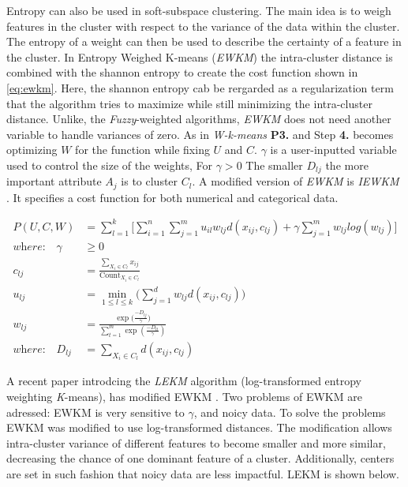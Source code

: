 \documentclass[../report.tex]{subfiles}
\begin{document}
Entropy can also be used in soft-subspace clustering. The main idea is to weigh features in the cluster with respect to the variance of the data within the cluster\cite{Domeniconi2007}. The entropy of a weight can then be used to describe the certainty of a feature in the cluster. In Entropy Weighed K-means (\textit{EWKM}) \cite{Jing2007} the intra-cluster distance is combined with the shannon entropy to create the cost function shown in \ref{eq:ewkm}. Here, the shannon entropy cab be rergarded as a regularization term that the algorithm tries to maximize while still minimizing the intra-cluster distance. Unlike, the \textit{Fuzzy}-weighted algorithms, \textit{EWKM} does not need another variable to handle variances of zero. As in \textit{W-k-means} \textbf{P3.} and Step \textbf{4.} becomes optimizing $W$ for the function while fixing $U$ and $C$. $\gamma$ is a user-inputted variable used to control the size of the weights, For $\gamma > 0$ The smaller $D_{ lj }$ the more important attribute $A_j$ is to cluster $C_l$. A modified version of \textit{EWKM} is \textit{IEWKM} \cite{Li2008}. It specifies a cost function for both numerical and categorical data.

\begin{align}
  P(U,C,W) &= \sum^k_{l=1} \Bigg[ \sum^n_{i=1} \sum^m_{j=1} u_{il} w_{ lj } d(x_{ij},c_{lj}) + \gamma \sum_{j=1}^{m}{ w_{lj} log (w_{lj}) } \Bigg] \\
\textit{where:}\quad\gamma&\geq 0 \\
\label{eq:ewkm}
c_{lj} &= \frac{\sum_{X_i \in C_l}{ x_{ij} }}{\text{Count}_{X_i \in C_l}} \\
u_{lj} &= \min_{1 \leq l \leq k}\Big( \sum_{j=1}^{d} w_{lj} d(x_{ij},c_{ lj })\Big) \\
	w_{lj} &= \frac{\exp({\frac{-D_{lj}}{\gamma})}}{\sum_{t=1}^{m}{\exp{(\frac{-D_{lt}}{\gamma})}}} \\
\textit{where:}\quad D_{ lj } &= \sum_{X_i \in C_l}{d(x_{ij},c_{ lj })}
\end{align}

A recent paper introdcing the \textit{LEKM} algorithm (log-transformed entropy weighting \textit{K}-means), has modified EWKM \cite{Gan2016}. Two problems of EWKM are adressed: EWKM is very sensitive to $\gamma$, and noicy data. To solve the problems EWKM was modified to use log-transformed distances. The modification allows intra-cluster variance of different features to become smaller and more similar, decreasing the chance of one dominant feature of a cluster. Additionally, centers are set in such fashion that noicy data are less impactful. LEKM is shown below.
\end{document}
